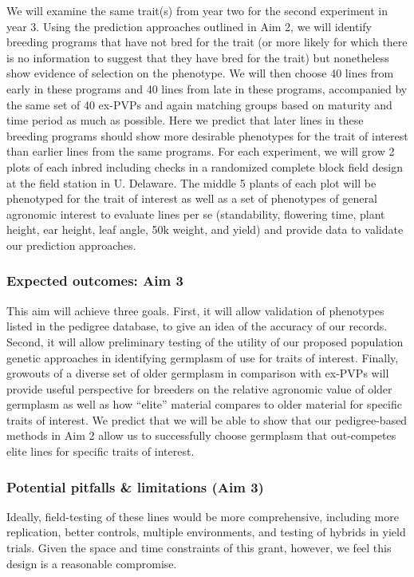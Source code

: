 \documentclass[12pt]{article}
\begin{document}
We will examine the same trait(s) from year two for the second experiment in year 3.  
Using the prediction approaches outlined in Aim 2, we will identify breeding programs that have not bred for the trait (or more likely for which there is no information to suggest that they have bred for the trait) but nonetheless show evidence of selection on the phenotype.  
We will then choose 40 lines from early in these programs and 40 lines from late in these programs, accompanied by the same set of 40 ex-PVPs and again matching groups based on maturity and time period as much as possible.
Here we predict that later lines in these breeding programs should show more desirable phenotypes for the trait of interest than earlier lines from the same programs.  
For each experiment, we will grow 2 plots of each inbred including checks in a randomized complete block field design at the field station in U. Delaware. 
The middle 5 plants of each plot will be phenotyped for the trait of interest as well as a set of phenotypes of general agronomic interest to evaluate lines per se (standability, flowering time, plant height, ear height, leaf angle, 50k weight, and yield) and provide data to validate our prediction approaches. 

\subsubsection*{Expected outcomes: Aim 3}
This aim will achieve three goals.
First, it will allow validation of phenotypes listed in the pedigree database, to give an idea of the accuracy of our records.
Second, it will allow preliminary testing of the utility of our proposed population genetic approaches in identifying germplasm of use for traits of interest.
Finally, growouts of a diverse set of older germplasm in comparison with ex-PVPs will provide useful perspective for breeders on the relative agronomic value of older germplasm as well as how ``elite'' material compares to older material for specific traits of interest.
We predict that we will be able to show that our pedigree-based methods in Aim 2 allow us to successfully choose germplasm that out-competes elite lines for specific traits of interest. 

\subsubsection*{Potential pitfalls \& limitations (Aim 3)}

Ideally, field-testing of these lines would be more comprehensive, including more replication, better controls, multiple environments, and testing of hybrids in yield trials.
Given the space and time constraints of this grant, however, we feel this design is a  reasonable compromise.
\end{document}
